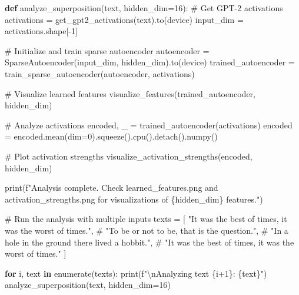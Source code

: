 \documentclass[
  letterpaper,
  DIV=11,
  numbers=noendperiod]{scrreprt}
\newenvironment{Shaded}{\begin{snugshade}}{\end{snugshade}}
\newcommand{\BuiltInTok}[1]{\textcolor[rgb]{0.00,0.23,0.31}{#1}}
\newcommand{\CharTok}[1]{\textcolor[rgb]{0.13,0.47,0.30}{#1}}
\newcommand{\CommentTok}[1]{\textcolor[rgb]{0.37,0.37,0.37}{#1}}
\newcommand{\ControlFlowTok}[1]{\textcolor[rgb]{0.00,0.23,0.31}{\textbf{#1}}}
\newcommand{\DecValTok}[1]{\textcolor[rgb]{0.68,0.00,0.00}{#1}}
\newcommand{\KeywordTok}[1]{\textcolor[rgb]{0.00,0.23,0.31}{\textbf{#1}}}
\newcommand{\NormalTok}[1]{\textcolor[rgb]{0.00,0.23,0.31}{#1}}
\newcommand{\OperatorTok}[1]{\textcolor[rgb]{0.37,0.37,0.37}{#1}}
\newcommand{\SpecialCharTok}[1]{\textcolor[rgb]{0.37,0.37,0.37}{#1}}
\newcommand{\SpecialStringTok}[1]{\textcolor[rgb]{0.13,0.47,0.30}{#1}}
\newcommand{\StringTok}[1]{\textcolor[rgb]{0.13,0.47,0.30}{#1}}
\begin{document}
\begin{Shaded}
\begin{Highlighting}[]
\KeywordTok{def}\NormalTok{ analyze\_superposition(text, hidden\_dim}\OperatorTok{=}\DecValTok{16}\NormalTok{):}
    \CommentTok{\# Get GPT{-}2 activations}
\NormalTok{    activations }\OperatorTok{=}\NormalTok{ get\_gpt2\_activations(text).to(device)}
\NormalTok{    input\_dim }\OperatorTok{=}\NormalTok{ activations.shape[}\OperatorTok{{-}}\DecValTok{1}\NormalTok{]}

    \CommentTok{\# Initialize and train sparse autoencoder}
\NormalTok{    autoencoder }\OperatorTok{=}\NormalTok{ SparseAutoencoder(input\_dim, hidden\_dim).to(device)}
\NormalTok{    trained\_autoencoder }\OperatorTok{=}\NormalTok{ train\_sparse\_autoencoder(autoencoder, activations)}

    \CommentTok{\# Visualize learned features}
\NormalTok{    visualize\_features(trained\_autoencoder, hidden\_dim)}

    \CommentTok{\# Analyze activations}
\NormalTok{    encoded, \_ }\OperatorTok{=}\NormalTok{ trained\_autoencoder(activations)}
\NormalTok{    encoded }\OperatorTok{=}\NormalTok{ encoded.mean(dim}\OperatorTok{=}\DecValTok{0}\NormalTok{).squeeze().cpu().detach().numpy()}

    \CommentTok{\# Plot activation strengths}
\NormalTok{    visualize\_activation\_strengths(encoded, hidden\_dim)}

    \BuiltInTok{print}\NormalTok{(}\SpecialStringTok{f"Analysis complete. Check \textquotesingle{}learned\_features.png\textquotesingle{} and \textquotesingle{}activation\_strengths.png\textquotesingle{} for visualizations of }\SpecialCharTok{\{}\NormalTok{hidden\_dim}\SpecialCharTok{\}}\SpecialStringTok{ features."}\NormalTok{)}

\CommentTok{\# Run the analysis with multiple inputs}
\NormalTok{texts }\OperatorTok{=}\NormalTok{ [}
    \StringTok{"It was the best of times, it was the worst of times."}\NormalTok{,}
    \CommentTok{\# "To be or not to be, that is the question.",}
    \CommentTok{\# "In a hole in the ground there lived a hobbit.",}
    \CommentTok{\# "It was the best of times, it was the worst of times."}
\NormalTok{]}

\ControlFlowTok{for}\NormalTok{ i, text }\KeywordTok{in} \BuiltInTok{enumerate}\NormalTok{(texts):}
    \BuiltInTok{print}\NormalTok{(}\SpecialStringTok{f"}\CharTok{\textbackslash{}n}\SpecialStringTok{Analyzing text }\SpecialCharTok{\{}\NormalTok{i}\OperatorTok{+}\DecValTok{1}\SpecialCharTok{\}}\SpecialStringTok{: \textquotesingle{}}\SpecialCharTok{\{}\NormalTok{text}\SpecialCharTok{\}}\SpecialStringTok{\textquotesingle{}"}\NormalTok{)}
\NormalTok{    analyze\_superposition(text, hidden\_dim}\OperatorTok{=}\DecValTok{16}\NormalTok{)}
\end{Highlighting}
\end{Shaded}
\end{document}
